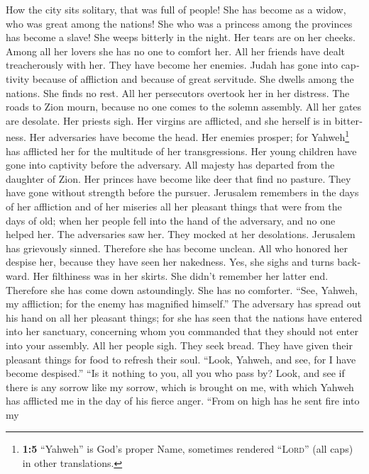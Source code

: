 \begin{paracol}{2}
\begin{otherlanguage}{english}
 How the city sits solitary, that was full of people! She
has become as a widow, who was great among the nations! She who was a
princess among the provinces has become a slave!  She
weeps bitterly in the night. Her tears are on her cheeks. Among all her
lovers she has no one to comfort her. All her friends have dealt
treacherously with her. They have become her enemies. 
Judah has gone into captivity because of affliction and because of great
servitude. She dwells among the nations. She finds no rest. All her
persecutors overtook her in her distress.  The roads to
Zion mourn, because no one comes to the solemn assembly. All her gates
are desolate. Her priests sigh. Her virgins are afflicted, and she
herself is in bitterness.  Her adversaries have become the
head. Her enemies prosper; for Yahweh\footnote{\textbf{1:5} ``Yahweh''
  is God's proper Name, sometimes rendered ``\textsc{Lord}'' (all caps)
  in other translations.} has afflicted her for the multitude of her
transgressions. Her young children have gone into captivity before the
adversary.  All majesty has departed from the daughter of
Zion. Her princes have become like deer that find no pasture. They have
gone without strength before the pursuer.  Jerusalem
remembers in the days of her affliction and of her miseries all her
pleasant things that were from the days of old; when her people fell
into the hand of the adversary, and no one helped her. The adversaries
saw her. They mocked at her desolations.  Jerusalem has
grievously sinned. Therefore she has become unclean. All who honored her
despise her, because they have seen her nakedness. Yes, she sighs and
turns backward.  Her filthiness was in her skirts. She
didn't remember her latter end. Therefore she has come down
astoundingly. She has no comforter. ``See, Yahweh, my affliction; for
the enemy has magnified himself.''  The adversary has
spread out his hand on all her pleasant things; for she has seen that
the nations have entered into her sanctuary, concerning whom you
commanded that they should not enter into your assembly. 
All her people sigh. They seek bread. They have given their pleasant
things for food to refresh their soul. ``Look, Yahweh, and see, for I
have become despised.''  ``Is it nothing to you, all you
who pass by? Look, and see if there is any sorrow like my sorrow, which
is brought on me, with which Yahweh has afflicted me in the day of his
fierce anger.  ``From on high has he sent fire into my

\end{otherlanguage}
\end{paracol}
